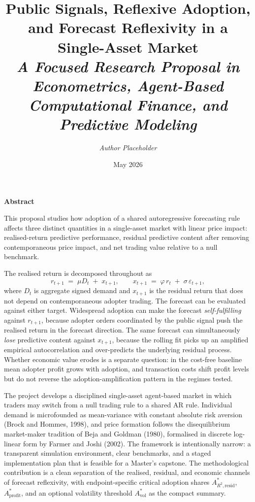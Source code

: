 \documentclass[11pt]{article}
\title{
  {\LARGE\bfseries Public Signals, Reflexive Adoption,\\ and Forecast Reflexivity in a Single-Asset Market}\\[0.8em]
  {\large\itshape A Focused Research Proposal in Econometrics, Agent-Based\\ Computational Finance, and Predictive Modeling}
}
\author{\textit{Author Placeholder}}
\date{May 2026}
\begin{document}
\maketitle

\vspace{0.25em}
\begin{center}
{\Large\bfseries\color{accent} Abstract}
\end{center}
\vspace{0.15em}

This proposal studies how adoption of a shared autoregressive forecasting rule affects three distinct quantities in a single-asset market with linear price impact: realised-return predictive performance, residual predictive content after removing contemporaneous price impact, and net trading value relative to a null benchmark.

The realised return is decomposed throughout as
\begin{equation*}
  r_{t+1} \;=\; \mu D_t \;+\; x_{t+1}, \qquad x_{t+1} \;=\; \varphi\, r_t \;+\; \sigma\, \varepsilon_{t+1},
\end{equation*}
where $D_t$ is aggregate signed demand and $x_{t+1}$ is the residual return that does not depend on contemporaneous adopter trading. The forecast can be evaluated against either target. Widespread adoption can make the forecast \emph{self-fulfilling} against $r_{t+1}$, because adopter orders coordinated by the public signal push the realised return in the forecast direction. The same forecast can simultaneously \emph{lose} predictive content against $x_{t+1}$, because the rolling fit picks up an amplified empirical autocorrelation and over-predicts the underlying residual process. Whether economic value erodes is a separate question: in the cost-free baseline mean adopter profit grows with adoption, and transaction costs shift profit levels but do not reverse the adoption-amplification pattern in the regimes tested.

The project develops a disciplined single-asset agent-based market in which traders may switch from a null trading rule to a shared AR rule. Individual demand is microfounded as mean-variance with constant absolute risk aversion (Brock and Hommes, 1998), and price formation follows the disequilibrium market-maker tradition of Beja and Goldman (1980), formalised in discrete log-linear form by Farmer and Joshi (2002). The framework is intentionally narrow: a transparent simulation environment, clear benchmarks, and a staged implementation plan that is feasible for a Master's capstone. The methodological contribution is a clean separation of the realised, residual, and economic channels of forecast reflexivity, with endpoint-specific critical adoption shares $A^{*}_{R^{2},\mathrm{resid}}$, $A^{*}_{\mathrm{profit}}$, and an optional volatility threshold $A^{*}_{\mathrm{vol}}$ as the compact summary.
\end{document}
